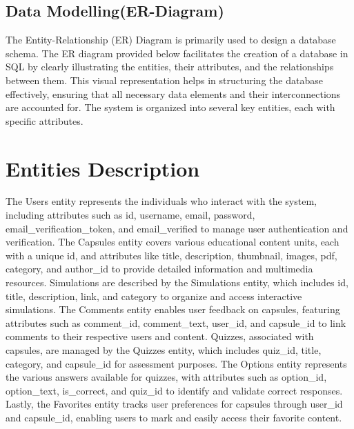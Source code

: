 \subsection{Data Modelling(ER-Diagram)}
The Entity-Relationship (ER) Diagram is primarily used to design a database schema. The ER diagram provided below facilitates the creation of a database in SQL by clearly illustrating the entities, their attributes, and the relationships between them. This visual representation helps in structuring the database effectively, ensuring that all necessary data elements and their interconnections are accounted for.
The system is organized into several key entities, each with specific attributes. 
\section*{Entities Description}
The Users entity represents the individuals who interact with the system, including attributes such as id, username, email, password, email\_verification\_token, and email\_verified to manage user authentication and verification. The Capsules entity covers various educational content units, each with a unique id, and attributes like title, description, thumbnail, images, pdf, category, and author\_id to provide detailed information and multimedia resources. Simulations are described by the Simulations entity, which includes id, title, description, link, and category to organize and access interactive simulations. The Comments entity enables user feedback on capsules, featuring attributes such as comment\_id, comment\_text, user\_id, and capsule\_id to link comments to their respective users and content. Quizzes, associated with capsules, are managed by the Quizzes entity, which includes quiz\_id, title, category, and capsule\_id for assessment purposes. The Options entity represents the various answers available for quizzes, with attributes such as option\_id, option\_text, is\_correct, and quiz\_id to identify and validate correct responses. Lastly, the Favorites entity tracks user preferences for capsules through user\_id and capsule\_id, enabling users to mark and easily access their favorite content.
